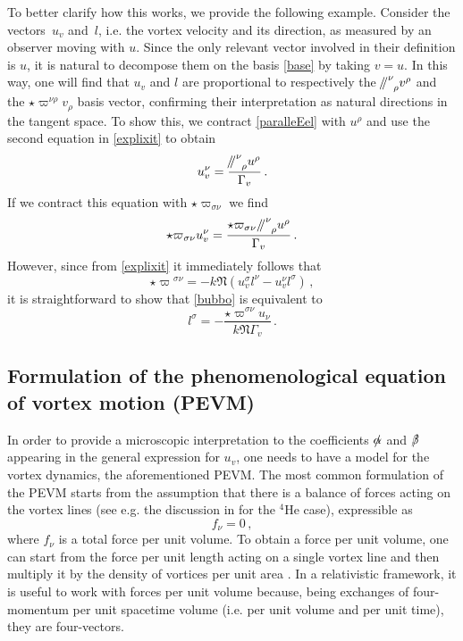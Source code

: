 \documentclass[preprints,article,accept,moreauthors,pdftex]{mdpi}
\newcommand{\paral}{\mathbin{\!/\mkern-5mu/\!}}
\begin{document}
To better clarify how this works, we provide the following example. Consider the vectors~$u_v$ and~$l$, i.e. the vortex velocity and its direction, as measured by an observer moving with $u$. Since the only relevant vector involved in their definition is $u$, it is natural to decompose them on the basis \eqref{base} by taking $v=u$. In this way, one will find that $u_v$ and $l$ are proportional to respectively the ${\paral \,}\indices{^\nu _\rho} v^\rho$ and the ${\star} \varpi^{\nu \rho}v_\rho$ basis vector, confirming their interpretation as natural directions in the tangent space.
To show this, we contract \eqref{paralleEel} with $u^\rho$ and use the second equation in \eqref{explixit} to obtain
\begin{equation}\label{uabaobab}
u_v^\nu = \dfrac{{\paral \,}\indices{^\nu _\rho} u^\rho}{\Gamma_v} \, .
\end{equation}
If we contract this equation with $\star \varpi_{\sigma \nu}$ we find
\begin{equation}\label{bubbo}
{\star \varpi}_{\sigma \nu} u_v^\nu = \dfrac{\star \varpi_{\sigma \nu} \, {\paral \,}\indices{^\nu _\rho} u^\rho}{\Gamma_v} \, .
\end{equation}
However, since from \eqref{explixit} it immediately follows that
\begin{equation}
{\star \varpi}^{\sigma \nu} = -k\mathfrak{N}(u_v^\sigma l^\nu - u_v^\nu l^\sigma) \, ,
\end{equation}
it is straightforward to show that \eqref{bubbo} is equivalent to
\begin{equation}
l^\sigma = -\dfrac{\star \varpi^{\sigma \nu} u_\nu }{k \mathfrak{N} \Gamma_v} \, .
\end{equation}

\subsection{Formulation of the phenomenological equation of vortex motion (PEVM)}
\label{forrRza!}

In order to provide a microscopic interpretation to the coefficients $\slashed{\alpha}$ and $\slashed{\beta}$ appearing in the general expression for $u_v$, one needs to have a model for the vortex dynamics, the aforementioned PEVM. The most common formulation of the PEVM starts from the assumption that there is a balance of forces acting on the vortex lines (see e.g. the discussion in \cite{sourie2020IJMPB} for the $^4$He case), expressible as
\begin{equation}\label{forzanulla}
f_\nu =0 \, ,
\end{equation}
where $f_\nu$ is a total force per unit volume. To obtain a force per unit volume, one can start from the force per unit length acting on a single vortex line and then multiply it by the density of vortices per unit area \cite{andersson_sidery_2006,Andersson_Mutual_Friction_2016}. 
In a relativistic framework, it is useful to work with forces per unit volume because, being exchanges of four-momentum per unit spacetime volume (i.e. per unit volume and per unit time), they are four-vectors. 
\end{document}
